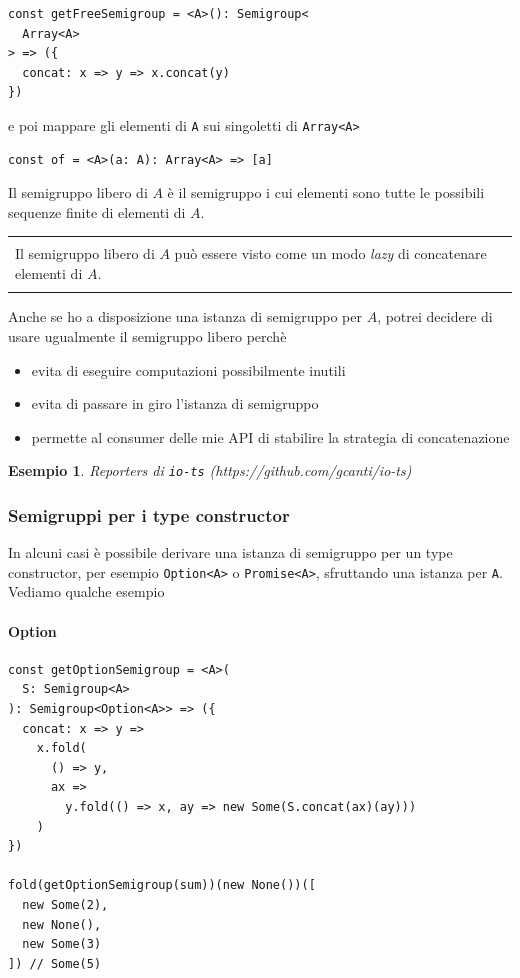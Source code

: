 \documentclass[12pt]{article}
\newtheorem{example}{Esempio}
\newenvironment{boxed}
    {\begin{center}
    \begin{tabular}{|p{0.9\textwidth}|}
    \hline\\
    }
    {
    \\\\\hline
    \end{tabular}
    \end{center}
    }
\begin{document}
\begin{verbatim}
const getFreeSemigroup = <A>(): Semigroup<
  Array<A>
> => ({
  concat: x => y => x.concat(y)
})
\end{verbatim}

e poi mappare gli elementi di \texttt{A} sui singoletti di \texttt{Array<A>}

\begin{verbatim}
const of = <A>(a: A): Array<A> => [a]
\end{verbatim}

Il semigruppo libero di $A$ è il semigruppo i cui elementi sono tutte le possibili sequenze finite di elementi di $A$.

\begin{boxed}
Il semigruppo libero di $A$ può essere visto come un modo \emph{lazy} di concatenare elementi di $A$.
\end{boxed}

Anche se ho a disposizione una istanza di semigruppo per $A$, potrei decidere di usare ugualmente il semigruppo libero perchè

\begin{itemize}
  \item evita di eseguire computazioni possibilmente inutili
  \item evita di passare in giro l'istanza di semigruppo
  \item permette al consumer delle mie API di stabilire la strategia di concatenazione
\end{itemize}

\begin{example}
Reporters di \texttt{io-ts} (https://github.com/gcanti/io-ts)
\end{example}

\subsubsection{Semigruppi per i type constructor}

In alcuni casi è possibile derivare una istanza di semigruppo per un type constructor, per esempio \texttt{Option<A>} o \texttt{Promise<A>},
sfruttando una istanza per \texttt{A}. Vediamo qualche esempio

\paragraph{Option}

\begin{verbatim}
const getOptionSemigroup = <A>(
  S: Semigroup<A>
): Semigroup<Option<A>> => ({
  concat: x => y =>
    x.fold(
      () => y,
      ax =>
        y.fold(() => x, ay => new Some(S.concat(ax)(ay)))
    )
})

fold(getOptionSemigroup(sum))(new None())([
  new Some(2),
  new None(),
  new Some(3)
]) // Some(5)
\end{verbatim}
\end{document}

